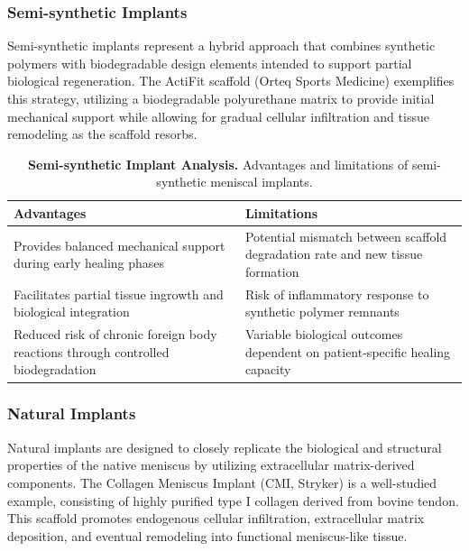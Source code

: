 \subsubsection{Semi-synthetic Implants}

Semi-synthetic implants represent a hybrid approach that combines synthetic polymers with biodegradable design elements intended to support partial biological regeneration. The ActiFit scaffold (Orteq Sports Medicine) exemplifies this strategy, utilizing a biodegradable polyurethane matrix to provide initial mechanical support while allowing for gradual cellular infiltration and tissue remodeling as the scaffold resorbs.

\begin{table}[H]
    \centering
    \renewcommand{\arraystretch}{1.3}
    \setlength{\tabcolsep}{10pt}
    \begin{tabular}{|p{6cm}|p{6cm}|}
        \hline
        \rowcolor{blue!20}
        \textbf{Advantages} & \textbf{Limitations} \\ \hline
        Provides balanced mechanical support during early healing phases & 
        Potential mismatch between scaffold degradation rate and new tissue formation \\ \hline
        Facilitates partial tissue ingrowth and biological integration & 
        Risk of inflammatory response to synthetic polymer remnants \\ \hline
        Reduced risk of chronic foreign body reactions through controlled biodegradation & 
        Variable biological outcomes dependent on patient-specific healing capacity \\ \hline
    \end{tabular}
    \caption{\textbf{Semi-synthetic Implant Analysis.} Advantages and limitations of semi-synthetic meniscal implants.}
    \label{tab:semi_synthetic_implants}
\end{table}

\subsubsection{Natural Implants}

Natural implants are designed to closely replicate the biological and structural properties of the native meniscus by utilizing extracellular matrix-derived components. The Collagen Meniscus Implant (CMI, Stryker) is a well-studied example, consisting of highly purified type I collagen derived from bovine tendon. This scaffold promotes endogenous cellular infiltration, extracellular matrix deposition, and eventual remodeling into functional meniscus-like tissue.

